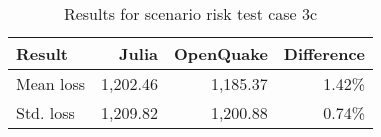 \begin{table}[h]

\centering
\begin{tabular}{ l r r r }

\hline
\rowcolor{anti-flashwhite}
\bf{Result} & \bf{Julia} & \bf{OpenQuake} & \bf{Difference}\\
\hline
Mean loss & 1,202.46 & 1,185.37 & 1.42\% \\
Std. loss & 1,209.82 & 1,200.88 & 0.74\% \\
\hline
\end{tabular}

\caption{Results for scenario risk test case 3c}
\label{tab:result-sr-3c}
\end{table}